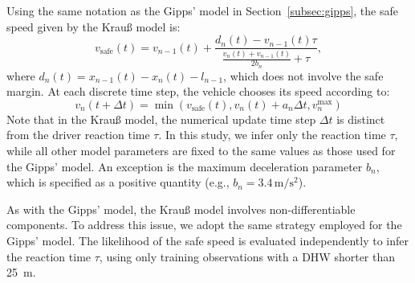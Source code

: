 \documentclass[journal]{IEEEtran}
\begin{document}
Using the same notation as the Gipps' model in Section~\ref{subsec:gipps}, the safe speed given by the Krau{\ss} model is:
\begin{equation}\label{eq:KraussSafe}
    v_{\text{safe}}(t)=v_{n-1}(t)+\frac{d_n(t)-v_{n-1}(t)\tau}{\frac{v_n(t)+v_{n-1}(t)}{2b_n}+\tau},
\end{equation}
where $d_n(t) = x_{n-1}(t) - x_n(t) - l_{n-1}$, which does not involve the safe margin. At each discrete time step, the vehicle chooses its speed according to:
\begin{equation}\label{eq:KruassUpdate}
    v_n(t+\Delta t)=\min\left(v_{\text{safe}}(t), v_n(t)+a_n \Delta t, v_n^{\max}\right)
\end{equation}
Note that in the Krau{\ss} model, the numerical update time step $\Delta t$ is distinct from the driver reaction time $\tau$. In this study, we infer only the reaction time $\tau$, while all other model parameters are fixed to the same values as those used for the Gipps' model. An exception is the maximum deceleration parameter $b_n$, which is specified as a positive quantity (e.g., $b_n = 3.4\,\mathrm{m/s^2}$).

As with the Gipps' model, the Krau{\ss} model involves non-differentiable components. To address this issue, we adopt the same strategy employed for the Gipps' model. The likelihood of the safe speed is evaluated independently to infer the reaction time $\tau$, using only training observations with a DHW shorter than 25~m.
\end{document}
